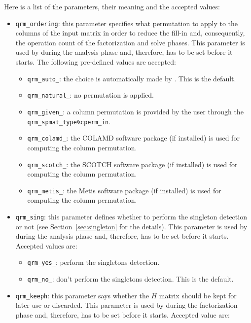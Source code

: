 \documentclass[11pt]{article}
\begin{document}
Here is a list of the parameters, their meaning and the accepted
values:

\begin{itemize}
\item \texttt{qrm\_ordering}: this parameter specifies what
  permutation to apply to the columns of the input matrix in order to
  reduce the fill-in and, consequently, the operation count of the
  factorization and solve phases. This parameter is used by \qrm
  during the analysis phase and, therefore, has to be set before it
  starts. The following pre-defined values are
  accepted:
  \begin{itemize}
  \item \texttt{qrm\_auto\_}: the choice is automatically made by
    \qrm. This is the default.
  \item \texttt{qrm\_natural\_}: no permutation is applied.
  \item \texttt{qrm\_given\_}: a column permutation is provided by the
    user through the \texttt{qrm\_spmat\_type\%cperm\_in}.
  \item \texttt{qrm\_colamd\_}: the COLAMD software package (if
    installed) is used for computing the column permutation.
  \item \texttt{qrm\_scotch\_}: the SCOTCH software package (if
    installed) is used for computing the column permutation.
  \item \texttt{qrm\_metis\_}: the Metis software package (if
    installed) is used for computing the column permutation.
  \end{itemize}
\item \texttt{qrm\_sing}: this parameter defines whether to perform
  the singleton detection or not (see Section~\ref{sec:singleton} for
  the details). This parameter is used by \qrm
  during the analysis phase and, therefore, has to be set before it
  starts. Accepted values are:
  \begin{itemize}
  \item \texttt{qrm\_yes\_}: perform the singletons detection.
  \item \texttt{qrm\_no\_}: don't perform the singletons
    detection. This is the default.
  \end{itemize}
\item \texttt{qrm\_keeph}: this parameter says whether the $H$ matrix
  should be kept for later use or discarded. This parameter is used by \qrm
  during the factorization phase and, therefore, has to be set before it
  starts. Accepted value are:
  \begin{itemize}

\end{itemize}
\end{itemize}
\end{document}
